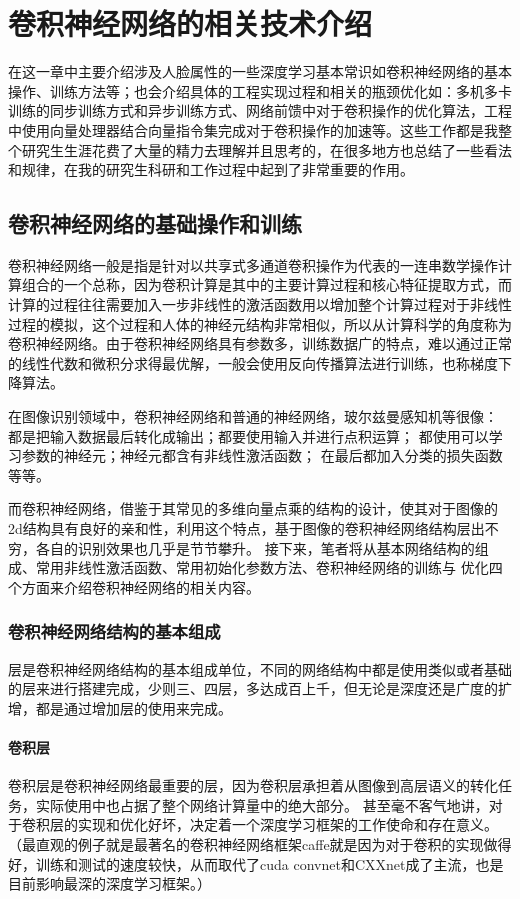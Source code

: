 \chapter {卷积神经网络的相关技术介绍}
在这一章中主要介绍涉及人脸属性的一些深度学习基本常识如卷积神经网络的基本操作、训练方法等；也会介绍具体的工程实现过程和相关的瓶颈优化如：多机多卡训练的同步训练方式和异步训练方式、网络前馈中对于卷积操作的优化算法，工程中使用向量处理器结合向量指令集完成对于卷积操作的加速等。这些工作都是我整个研究生生涯花费了大量的精力去理解并且思考的，在很多地方也总结了一些看法和规律，在我的研究生科研和工作过程中起到了非常重要的作用。

\section{卷积神经网络的基础操作和训练}
卷积神经网络一般是指是针对以共享式多通道卷积操作为代表的一连串数学操作计算组合的一个总称，因为卷积计算是其中的主要计算过程和核心特征提取方式，而计算的过程往往需要加入一步非线性的激活函数用以增加整个计算过程对于非线性过程的模拟，这个过程和人体的神经元结构非常相似，所以从计算科学的角度称为卷积神经网络。由于卷积神经网络具有参数多，训练数据广的特点，难以通过正常的线性代数和微积分求得最优解，一般会使用反向传播算法\cite{BP}进行训练，也称梯度下降算法。

在图像识别领域中，卷积神经网络和普通的神经网络，玻尔兹曼感知机等很像：
都是把输入数据最后转化成输出；都要使用输入并进行点积运算；
都使用可以学习参数的神经元；神经元都含有非线性激活函数；
在最后都加入分类的损失函数等等。

而卷积神经网络，借鉴于其常见的多维向量点乘的结构的设计，使其对于图像的2d结构具有良好的亲和性，利用这个特点，基于图像的卷积神经网络结构层出不穷，各自的识别效果也几乎是节节攀升。 
接下来，笔者将从基本网络结构的组成、常用非线性激活函数、常用初始化参数方法、卷积神经网络的训练与 优化四个方面来介绍卷积神经网络的相关内容。
\subsection{卷积神经网络结构的基本组成}
层是卷积神经网络结构的基本组成单位，不同的网络结构中都是使用类似或者基础的层来进行搭建完成，少则三、四层，多达成百上千，但无论是深度还是广度的扩增，都是通过增加层的使用来完成。
\subsubsection{卷积层}
卷积层\cite{ALEXNET}是卷积神经网络最重要的层，因为卷积层承担着从图像到高层语义的转化任务，实际使用中也占据了整个网络计算量中的绝大部分。
甚至毫不客气地讲，对于卷积层的实现和优化好坏，决定着一个深度学习框架的工作使命和存在意义。（最直观的例子就是最著名的卷积神经网络框架caffe就是因为对于卷积的实现做得好，训练和测试的速度较快，从而取代了cuda convnet和CXXnet成了主流，也是目前影响最深的深度学习框架。）

